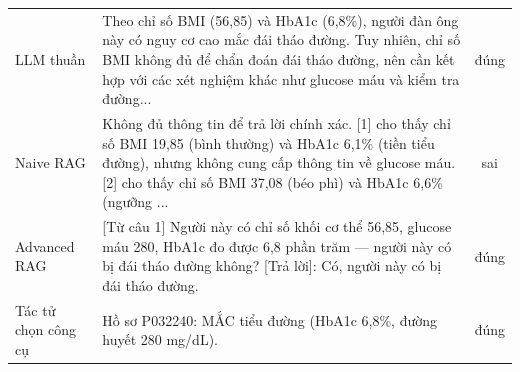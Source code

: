\begin{tabular}{L{2.6cm}L{11.0cm}c}
LLM thuần & Theo chỉ số BMI (56,85) và HbA1c (6,8\%), người đàn ông này có nguy cơ cao mắc đái tháo đường. Tuy nhiên, chỉ số BMI không đủ để chẩn đoán đái tháo đường, nên cần kết hợp với các xét nghiệm khác như glucose máu và kiểm tra đường... & \textcolor{cGreen}{đúng} \\
Naive RAG & Không đủ thông tin để trả lời chính xác. [1] cho thấy chỉ số BMI 19,85 (bình thường) và HbA1c 6,1\% (tiền tiểu đường), nhưng không cung cấp thông tin về glucose máu. [2] cho thấy chỉ số BMI 37,08 (béo phì) và HbA1c 6,6\% (ngưỡng ... & \textcolor{cRed}{sai} \\
Advanced RAG & [Từ câu 1] Người này có chỉ số khối cơ thể 56,85, glucose máu 280, HbA1c đo được 6,8 phần trăm — người này có bị đái tháo đường không? [Trả lời]: Có, người này có bị đái tháo đường. & \textcolor{cGreen}{đúng} \\
Tác tử chọn công cụ & Hồ sơ P032240: MẮC tiểu đường (HbA1c 6,8\%, đường huyết 280 mg/dL). & \textcolor{cGreen}{đúng} \\
\bottomrule
\end{tabular}
